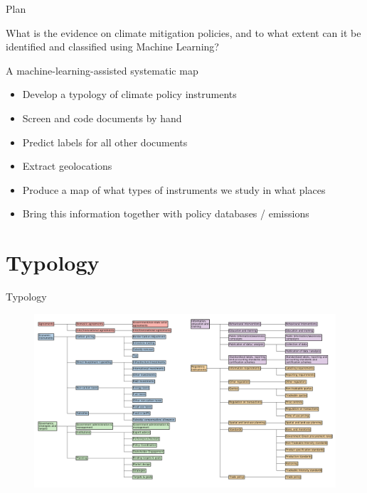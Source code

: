 \documentclass[9pt]{beamer}
\begin{document}
\begin{frame}{Plan}

What is the evidence on climate mitigation policies, and to what extent can it be identified and classified using Machine Learning?

\medskip

A machine-learning-assisted systematic map

\begin{itemize}
	\item Develop a typology of climate policy instruments
	\item Screen and code documents by hand
	\item Predict labels for all other documents
	\item Extract geolocations
	\item Produce a map of what types of instruments we study in what places
	\item Bring this information together with policy databases / emissions
\end{itemize}
\end{frame}


\section{Typology}
\begin{frame}{Typology}

\begin{figure}
	\includegraphics[width=\linewidth]{../figures/typology_wide.pdf}
\end{figure}
\end{frame}
\end{document}
